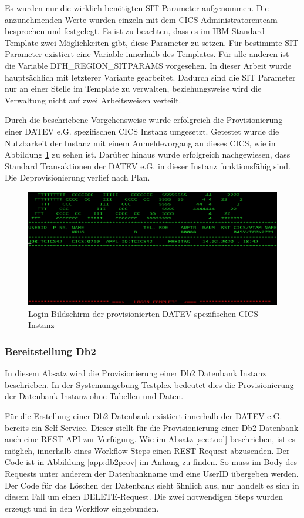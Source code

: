 Es wurden nur die wirklich benötigten SIT Parameter aufgenommen.
Die anzunehmenden Werte wurden einzeln mit dem CICS Administratorenteam besprochen und festgelegt.
Es ist zu beachten, dass es im IBM Standard Template zwei Möglichkeiten gibt, diese Parameter zu setzen.
Für bestimmte SIT Parameter existiert eine Variable innerhalb des Templates.
Für alle anderen ist die Variable \glqq DFH\_REGION\_SITPARAMS\grqq{} vorgesehen.
In dieser Arbeit wurde hauptsächlich mit letzterer Variante gearbeitet.
Dadurch sind die SIT Parameter nur an einer Stelle im Template zu verwalten, beziehungsweise wird die Verwaltung  nicht auf zwei Arbeitsweisen verteilt.

Durch die beschriebene Vorgehensweise wurde erfolgreich die Provisionierung einer DATEV e.G. spezifischen CICS Instanz umgesetzt.
Getestet wurde die Nutzbarkeit der Instanz mit einem Anmeldevorgang an dieses CICS, wie in Abbildung \ref{fig:cicslogin} zu sehen ist.
Darüber hinaus wurde erfolgreich nachgewiesen, dass Standard Transaktionen der DATEV e.G.  in dieser Instanz funktionsfähig sind.
Die Deprovisionierung verlief nach Plan.

\begin{figure}[h]
	\centering
	\includegraphics[width=\textwidth]{figures/logonscreen.PNG}
	\caption{Login Bildschirm der provisionierten DATEV spezifischen CICS-Instanz}
	\label{fig:cicslogin}
\end{figure}

\subsubsection{Bereitstellung Db2}\label{sssec:db2tpl}
In diesem Absatz wird die Provisionierung einer Db2 Datenbank Instanz beschrieben.
In der Systemumgebung Testplex bedeutet dies die Provisionierung der Datenbank Instanz ohne Tabellen und Daten.

Für die Erstellung einer Db2 Datenbank existiert innerhalb der DATEV e.G. bereits ein \glqq Self Service\grqq.
Dieser stellt für die Provisionierung einer Db2 Datenbank auch eine REST-API zur Verfügung.
Wie im Absatz \ref{sec:tool} beschrieben, ist es möglich, innerhalb eines Workflow Steps einen REST-Request abzusenden.
Der Code ist in Abbildung \ref{app:db2prov} im Anhang zu finden.
So muss im Body des Requests unter anderem der Datenbankname und eine UserID übergeben werden.
Der Code für das Löschen der Datenbank sieht ähnlich aus, nur handelt es sich in diesem Fall um einen DELETE-Request.
Die zwei notwendigen Steps wurden erzeugt und in den Workflow eingebunden.

